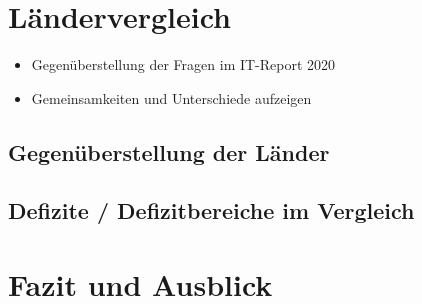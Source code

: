 \section{Ländervergleich}
	\begin{itemize}
		\item Gegenüberstellung der Fragen im IT-Report 2020 \parencite{huebner2020}
		\item Gemeinsamkeiten und Unterschiede aufzeigen
	\end{itemize}
	\subsection{Gegenüberstellung der Länder}
	\subsection{Defizite / Defizitbereiche im Vergleich}
\section{Fazit und Ausblick}

\newpage
{}
\setcounter{page}{3}
\printbibliography
{}

